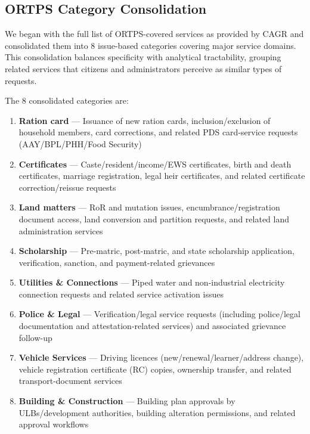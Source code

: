 \documentclass[11pt,a4paper]{article}
\begin{document}
\subsection{ORTPS Category Consolidation}

We began with the full list of ORTPS-covered services as provided by CAGR and consolidated them into 8 issue-based categories covering major service domains. This consolidation balances specificity with analytical tractability, grouping related services that citizens and administrators perceive as similar types of requests.

The 8 consolidated categories are:

\begin{enumerate}
    \item \textbf{Ration card} --- Issuance of new ration cards, inclusion/exclusion of household members, card corrections, and related PDS card-service requests (AAY/BPL/PHH/Food Security)

    \item \textbf{Certificates} --- Caste/resident/income/EWS certificates, birth and death certificates, marriage registration, legal heir certificates, and related certificate correction/reissue requests

    \item \textbf{Land matters} --- RoR and mutation issues, encumbrance/registration document access, land conversion and partition requests, and related land administration services

    \item \textbf{Scholarship} --- Pre-matric, post-matric, and state scholarship application, verification, sanction, and payment-related grievances

    \item \textbf{Utilities \& Connections} --- Piped water and non-industrial electricity connection requests and related service activation issues

    \item \textbf{Police \& Legal} --- Verification/legal service requests (including police/legal documentation and attestation-related services) and associated grievance follow-up

    \item \textbf{Vehicle Services} --- Driving licences (new/renewal/learner/address change), vehicle registration certificate (RC) copies, ownership transfer, and related transport-document services

    \item \textbf{Building \& Construction} --- Building plan approvals by ULBs/development authorities, building alteration permissions, and related approval workflows
\end{enumerate}
\end{document}
